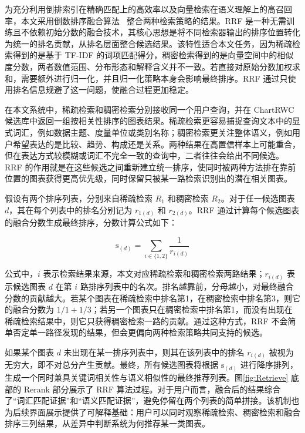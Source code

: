 为充分利用倒排索引在精确匹配上的高效率以及向量检索在语义理解上的高召回率，本文采用倒数排序融合算法~\cite{clarke2008novelty} 整合两种检索策略的结果。RRF 是一种无需训练且不依赖初始分数的融合技术，其核心思想是将不同检索器输出的排序位置转化为统一的排名贡献，从排名层面整合候选结果。该特性适合本文任务，因为稀疏检索得到的是基于 TF-IDF 的词项匹配得分，稠密检索得到的是向量空间中的相似度分数，两者数值范围、分布形态和解释含义并不一致。若直接对原始分数加权求和，需要额外进行归一化，并且归一化策略本身会影响最终排序。RRF 通过只使用排名信息规避了这一问题，使融合过程更加稳定。

在本文系统中，稀疏检索和稠密检索分别接收同一个用户查询，并在 ChartRWC 候选库中返回一组按相关性排序的图表结果。稀疏检索更容易捕捉查询文本中的显式词汇，例如数据主题、度量单位或类别名称；稠密检索更关注整体语义，例如用户希望表达的是比较、趋势、构成还是关系。两种结果在高置信样本上可能重合，但在表达方式较模糊或词汇不完全一致的查询中，二者往往会给出不同候选。RRF 的作用就是在这些候选之间重新建立统一排序，使同时被两种方法排在靠前位置的图表获得更高优先级，同时保留只被某一路检索识别出的潜在相关图表。

假设有两个排序列表，分别来自稀疏检索 $R_1$ 和稠密检索 $R_2$。对于任一候选图表 $d$，其在每个列表中的排名分别记为 $r_{1(d)}$ 和 $r_{2(d)}$。RRF 通过计算每个候选图表的融合分数生成最终排序，分数计算公式如下：

\begin{equation}
    \text{s}_{(d)} = \sum_{i \in \{1,2\}} \frac{1}{r_{i(d)}}
\end{equation}

公式中，$i$ 表示检索结果来源，本文对应稀疏检索和稠密检索两路结果；$r_{i(d)}$ 表示候选图表 $d$ 在第 $i$ 路排序列表中的名次。排名越靠前，分母越小，对最终融合分数的贡献越大。若某个图表在稀疏检索中排名第1，在稠密检索中排名第3，则它的融合分数为 $1/1+1/3$；若另一个图表只在稠密检索中排名第1，而没有出现在稀疏检索结果中，则它只获得稠密检索一路的贡献。通过这种方式，RRF 不会简单否定单一路径发现的结果，但会更偏向两种检索策略共同支持的候选。

如果某个图表 $d$ 未出现在某一排序列表中，则其在该列表中的排名 $r_{i(d)}$ 被视为无穷大，即不对总分产生贡献。最终，所有候选图表将根据 $\text{s}_{(d)}$ 进行降序排列，生成一个同时兼具关键词相关性与语义相似性的最终推荐列表。图\ref{fig:Retrieve} 底部的 Rerank 部分展示了 RRF 算法过程。对于用户而言，融合后的结果综合了“词汇匹配证据”和“语义匹配证据”，避免停留在两个列表的简单拼接。该机制也为后续界面展示提供了可解释基础：用户可以同时观察稀疏检索、稠密检索和融合排序三列结果，从差异中判断系统为何推荐某一类图表。

